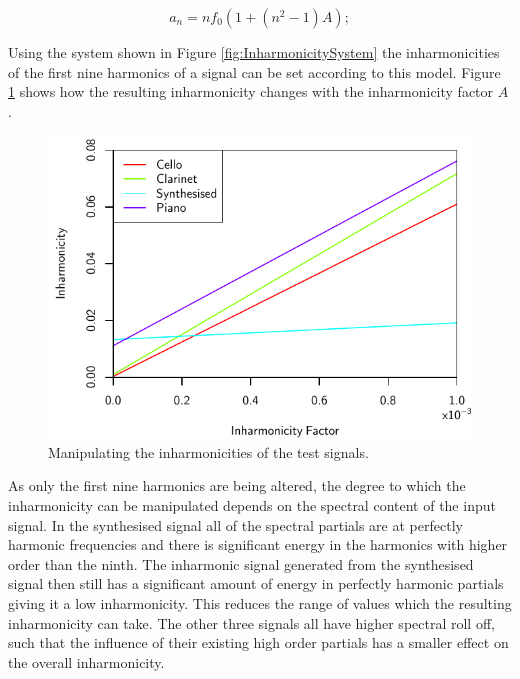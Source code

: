 		\begin{equation}
			a_{n} = nf_{0} \left( 1 + \left( n^{2} - 1 \right) A \right);
			\label{eq:PianoInharmonicity}
		\end{equation}

		Using the system shown in Figure \ref{fig:InharmonicitySystem} the inharmonicities of the first nine
		harmonics of a signal can be set according to this model. Figure \ref{fig:MoveInharmonicities} shows how
		the resulting inharmonicity changes with the inharmonicity factor $A$.

		\begin{figure}[h!]
			\centering
			\includegraphics{chapter6/Images/MoveInharmonicities.pdf}
			\caption{Manipulating the inharmonicities of the test signals.}
			\label{fig:MoveInharmonicities}
		\end{figure}

		As only the first nine harmonics are being altered, the degree to which the inharmonicity can be
		manipulated depends on the spectral content of the input signal. In the synthesised signal all of the
		spectral partials are at perfectly harmonic frequencies and there is significant energy in the harmonics
		with higher order than the ninth. The inharmonic signal generated from the synthesised signal then still
		has a significant amount of energy in perfectly harmonic partials giving it a low inharmonicity. This
		reduces the range of values which the resulting inharmonicity can take. The other three signals all have
		higher spectral roll off, such that the influence of their existing high order partials has a smaller
		effect on the overall inharmonicity.

